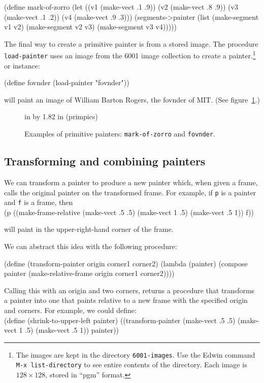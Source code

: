 \beginlisp
(define mark-of-zorro
  (let ((v1 (make-vect .1 .9))
        (v2 (make-vect .8 .9))
        (v3 (make-vect .1 .2))
        (v4 (make-vect .9 .3)))
    (segments->painter
     (list (make-segment v1 v2)
           (make-segment v2 v3)
           (make-segment v3 v4)))))
\endlisp

The final way to create a primitive painter is from a stored image.
The procedure {\tt load-painter} uses an image from the 6001 image
collection to create a painter.\footnote{The images are kept in the
directory {\tt 6001-images}.  Use the Edwin command
{\tt M-x list-directory} to see entire contents of the directory.
Each image is $128\times 128$, stored in ``pgm'' format.}
or instance:

\beginlisp
(define fovnder (load-painter "fovnder"))
\endlisp

\noindent
will paint an image of William Barton Rogers, the {\sc fovnder} of MIT.
(See figure~\ref{primitive-painters}.) 

\begin{figure}
 in by 1.82 in (primpics)
\caption{{\protect\footnotesize
Examples of primitive painters: {\tt mark-of-zorro} and {\tt fovnder}.}}
\label{primitive-painters}
\end{figure} 

\subsection{Transforming and combining painters}

We can transform a painter to produce a new painter which, when
given a frame, calls the original painter on the transformed frame.
For example, if {\tt p} is a painter and {\tt f} is a frame, then\\
\beginlisp
(p ((make-frame-relative (make-vect .5 .5) (make-vect 1 .5) (make-vect .5 1))
    f))
\endlisp

\noindent
will paint in the upper-right-hand corner of the frame.

We can abstract this idea with the following procedure:

\beginlisp
(define (transform-painter origin corner1 corner2)
  (lambda (painter)
    (compose painter
             (make-relative-frame origin corner1 corner2))))
\endlisp

\noindent
Calling this with an origin and two corners, returns a procedure that
transforms a painter into one that paints relative to a new frame with
the specified origin and corners.  For example, we could define:\\
\beginlisp
(define (shrink-to-upper-left painter)
  ((transform-painter (make-vect .5 .5) (make-vect 1 .5) (make-vect .5 1))
   painter))
\endlisp

